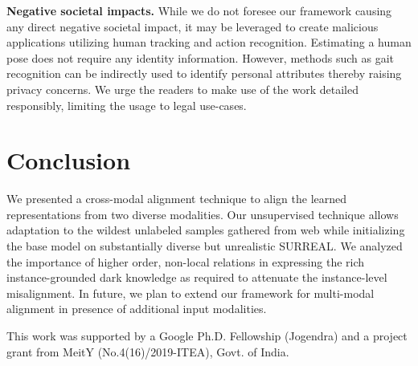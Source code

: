 \documentclass{article}
\begin{document}
\textbf{Negative societal impacts.}
While we do not foresee our framework causing any direct negative societal impact, it may be leveraged to create malicious applications utilizing human tracking and action recognition. Estimating a human pose does not require any identity information. However, methods such as gait recognition can be indirectly used to identify personal attributes thereby raising privacy concerns. We urge the readers to make use of the work detailed responsibly, limiting the usage to legal use-cases.


\section{Conclusion}

We presented a cross-modal alignment technique to align the learned representations from two diverse modalities. Our unsupervised technique allows adaptation to the wildest unlabeled samples gathered from web while initializing the base model on substantially diverse but unrealistic SURREAL. We analyzed the importance of higher order, non-local relations in expressing the rich instance-grounded dark knowledge as required to attenuate the instance-level misalignment. In future, we plan to extend our framework for multi-modal alignment in presence of additional input modalities.





\begin{ack}
This work was supported by a Google Ph.D. Fellowship (Jogendra) and a project grant from MeitY (No.4(16)/2019-ITEA), Govt. of India.
\end{ack}






\small


\end{document}
